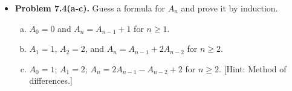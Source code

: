 \documentclass[11pt]{article}
\begin{document}
\begin{itemize}
\vspace{0.1in}

\item \textbf{Problem 7.4(a-c).}
  Guess a formula for $A_n$ and prove it by induction.
  \begin{enumerate}[(a)]
  \item $A_0=0$ and $A_n=A_{n-1}+1$ for $n\ge 1$.
  \item $A_1=1$, $A_2=2$, and $A_n=A_{n-1}+2A_{n-2}$ for $n\ge 2$.
  \item $A_0=1$; $A_1=2$; $A_n=2A_{n-1}-A_{n-2}+2$ for $n\ge 2$.
    [Hint: Method of differences.]
  \end{enumerate}

\end{itemize}
\end{document}
